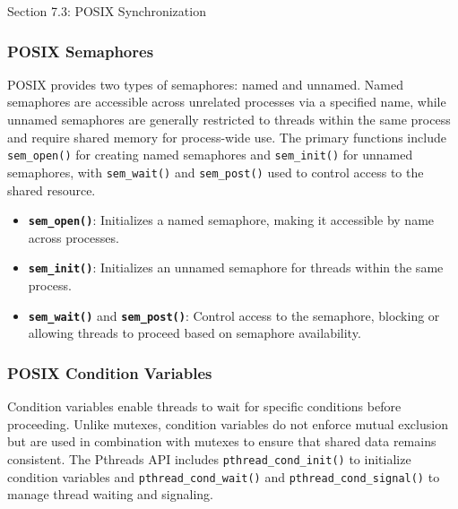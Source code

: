 \begin{notes}{Section 7.3: POSIX Synchronization}
\begin{highlight}
    \end{highlight}
    
    \subsubsection*{POSIX Semaphores}
    
    POSIX provides two types of semaphores: named and unnamed. Named semaphores are accessible across unrelated processes via a specified name, while unnamed semaphores are generally restricted to 
    threads within the same process and require shared memory for process-wide use. The primary functions include \texttt{sem\_open()} for creating named semaphores and \texttt{sem\_init()} for 
    unnamed semaphores, with \texttt{sem\_wait()} and \texttt{sem\_post()} used to control access to the shared resource.
    
    \begin{highlight}
    
        \begin{itemize}
            \item \textbf{\texttt{sem\_open()}}: Initializes a named semaphore, making it accessible by name across processes.
            \item \textbf{\texttt{sem\_init()}}: Initializes an unnamed semaphore for threads within the same process.
            \item \textbf{\texttt{sem\_wait()}} and \textbf{\texttt{sem\_post()}}: Control access to the semaphore, blocking or allowing threads to proceed based on semaphore availability.
        \end{itemize}
    
    \end{highlight}
    
    \subsubsection*{POSIX Condition Variables}
    
    Condition variables enable threads to wait for specific conditions before proceeding. Unlike mutexes, condition variables do not enforce mutual exclusion but are used in combination with mutexes 
    to ensure that shared data remains consistent. The Pthreads API includes \texttt{pthread\_cond\_init()} to initialize condition variables and \texttt{pthread\_cond\_wait()} and 
    \texttt{pthread\_cond\_signal()} to manage thread waiting and signaling.
    

\end{notes}
